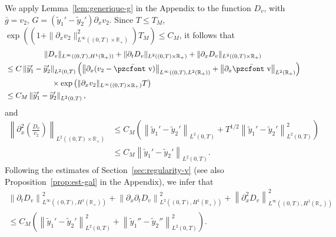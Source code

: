 \documentclass[10pt]{amsart}
\theoremstyle{definition}\newtheorem{defi}[theo]{Definition}\newtheorem{rema}[theo]{Remark}\newtheorem{exam}[theo]{Example}\newtheorem{exem}[theo]{Example}\newtheorem{nota}[theo]{Notation}
\newcommand{\mathpzc}[1]{\text{\pzcfont #1}}
\newcommand{\R}{\mathbb{R}}
\newcommand{\p}{\partial}
\newcommand{\bv}{\bar{\mathpzc{v}}}
\newcommand{\ty}{\widetilde{y}}
\newcommand{\dv}{D_v}
\begin{document}
We apply Lemma~\ref{lem:generique-g} in the Appendix to the function $\dv$, with $\bar g=v_2$, $G= (\ty_1'-\ty_2')\p_x v_2$. Since $T\leq T_M$, $\exp((1+\|\p_x v_2\|_{L^\infty((0,T)\times \R_+)}^2) T_M)\leq C_M$, it follows that
\begin{multline*}
\|\dv\|_{L^\infty\left((0,T), H^1(\R_+)\right)} + \|\p_t \dv\|_{L^2\left((0,T)\times \R_+\right)} + \|\p_x \dv\|_{L^2((0,T)\times \R_+)} \\
\begin{aligned}
&\leq C\left\|\ty_1'-\ty_2'\right\|_{L^2(0,T)}\left(\left\|\p_x (v_2 - \bv)\right\|_{L^\infty\left((0,T), L^2(\R_+)\right)} + \left\|\p_x \bv\right\|_{L^2(\R_+)} \right)\\
&\qquad\qquad\qquad\times
\exp\left(\|\p_x v_2\|_{L^\infty((0,T)\times \R_+)} T\right)\\
&\leq C_M \left\|\ty_1'-\ty_2'\right\|_{L^2(0,T)},
\end{aligned}
\end{multline*}
and
\begin{align*}
\left\| \p_x^2 \left(\frac{\dv}{v_2}\right)\right\|_{L^2\left((0,T)\times \R_+\right)} & \leq C_M \left(\left\|\ty_1'-\ty_2'\right\|_{L^2(0,T)} + T^{1/2}\left\|\ty_1'-\ty_2'\right\|_{L^2(0,T)}^2\right)
\\
&\leq C_M \left\|\ty_1'-\ty_2'\right\|_{L^2(0,T)}.
\end{align*}
Following the estimates of Section~\ref{sec:regularity-v} (see also Proposition~\ref{prop:est-gal} in the Appendix), we infer that
\begin{multline*}
\left\|\p_t \dv \right\|_{L^\infty\left((0,T), H^1(\R_+)\right)}^2 + \left\|\p_x \p_t \dv\right\|_{L^2\left((0,T), H^1(\R_+)\right)}^2 + \left\|\p_x^2 \dv\right\|_{L^\infty\left((0,T), H^1(\R_+)\right)}^2\\
\leq C_M \left(\left\|\ty_1'-\ty_2'\right\|_{L^2(0,T)}^2 + \left\|\ty_1''-\ty_2''\right\|_{L^2(0,T)}^2\right).
\end{multline*}
\end{document}
